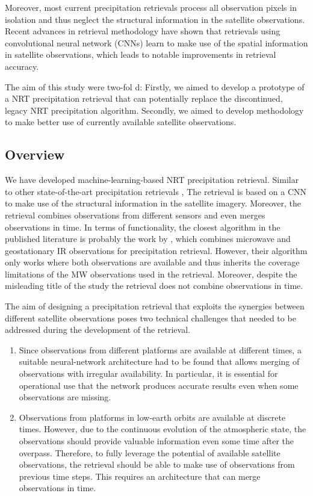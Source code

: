 \documentclass[11pt]{scrartcl}
\begin{document}
Moreover, most current precipitation retrievals process all observation pixels
in isolation and thus neglect the structural information in the satellite
observations. Recent advances in retrieval methodology \citep{pfreundschuh22}
have shown that retrievals using convolutional neural network (CNNs) learn to
make use of the spatial information in satellite observations, which leads to
notable improvements in retrieval accuracy.

The aim of this study were two-fol d: Firstly, we aimed to develop a prototype
of a NRT precipitation retrieval that can potentially replace the discontinued,
legacy NRT precipitation algorithm. Secondly, we aimed to develop methodology
to make better use of currently available satellite observations.

\subsection{Overview}
\label{sec:org073dc78}

We have developed machine-learning-based NRT precipitation retrieval. Similar to
other state-of-the-art precipitation retrievals \citep{pfreundschuh22,
  pfreundschuh22a}, The retrieval is based on a CNN to make use of the
structural information in the satellite imagery. Moreover, the retrieval
combines observations from different sensors and even merges observations in
time. In terms of functionality, the closest algorithm in the published
literature is probably the work by \citet{gorooh22}, which combines microwave
and geostationary IR observations for precipitation retrieval. However, their
algorithm only works where both observations are available and thus inherits the
coverage limitations of the MW observations used in the retrieval. Moreover,
despite the misleading title of the study the retrieval does not combine
observations in time.

The aim of designing a precipitation retrieval that exploits the synergies
between different satellite observations poses two technical challenges that
needed to be addressed during the development of the retrieval.
\begin{enumerate}
\item Since observations from different platforms are available at different
    times, a suitable neural-network architecture had to be found that allows merging
    of observations with irregular availability. In particular, it is essential
    for operational use that the network produces accurate results even when some
    observations are missing.
\item Observations from platforms in low-earth orbits are available at discrete
  times. However, due to the continuous evolution of the atmospheric state, the
  observations should provide valuable information even some time after the overpass.
  Therefore, to fully leverage the potential of available satellite observations, the
  retrieval should be able to make use of observations from previous time steps.
  This requires an architecture that can merge observations in time. 
\end{enumerate}
\end{document}
